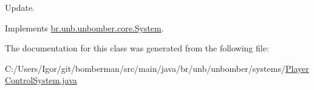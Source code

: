 Update. 



Implements \hyperlink{interfacebr_1_1unb_1_1unbomber_1_1core_1_1_system_a6b1268f3fef77e2ce797eedc1b34eb44}{br.\+unb.\+unbomber.\+core.\+System}.



The documentation for this class was generated from the following file\+:\begin{DoxyCompactItemize}
\item 
C\+:/\+Users/\+Igor/git/bomberman/src/main/java/br/unb/unbomber/systems/\hyperlink{_player_control_system_8java}{Player\+Control\+System.\+java}\end{DoxyCompactItemize}
